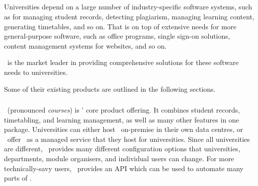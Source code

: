 
\subsection{\higherEdFullName}

Universities depend on a large number of industry-specific software systems, such as for managing student records, detecting plagiarism, managing learning content, generating timetables, and so on. That is on top of extensive needs for more general-purpose software, such as office programs, single sign-on solutions, content management systems for websites, and so on.

\higherEdFullName\ is the market leader in providing comprehensive solutions for these software needs to universities.

Some of their existing products are outlined in the following sections.

\subsubsection{\higherEdCSRS}

\higherEdCSRS\ (pronounced \emph{courses}) is \higherEdShortName' core product offering. It combines student records, timetabling, and learning management, as well as many other features in one package. Universities can either host \higherEdCSRS\ on-premise in their own data centres, or \higherEdShortName\ offer \higherEdCSRS\ as a managed service that they host for universities. Since all universities are different, \higherEdCSRS\ provides many different configuration options that universities, departments, module organisers, and individual users can change. For more technically-savy users, \higherEdCSRS\ provides an API which can be used to automate many parts of \higherEdCSRS.

\subsubsection{\higherEdAntiCheat}

